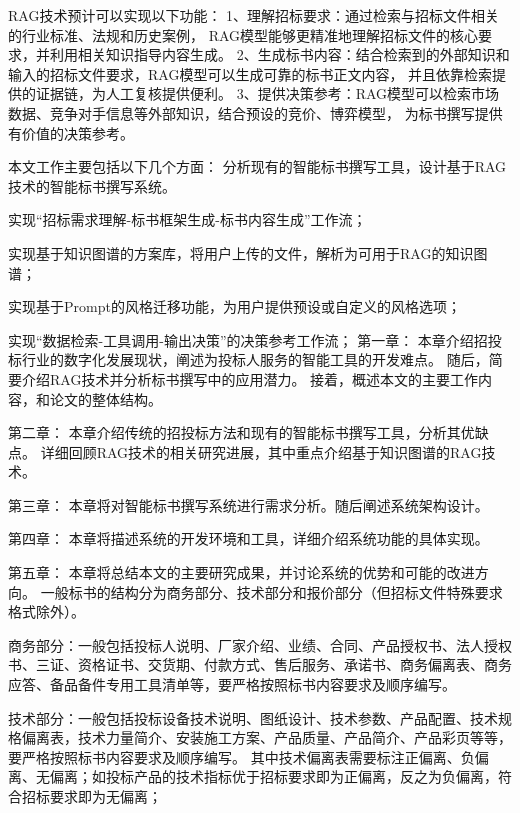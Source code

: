 \documentclass{xmu}
\begin{document}
RAG技术预计可以实现以下功能：
1、理解招标要求：通过检索与招标文件相关的行业标准、法规和历史案例，
RAG模型能够更精准地理解招标文件的核心要求，并利用相关知识指导内容生成。
2、生成标书内容：结合检索到的外部知识和输入的招标文件要求，RAG模型可以生成可靠的标书正文内容，
并且依靠检索提供的证据链，为人工复核提供便利。
3、提供决策参考：RAG模型可以检索市场数据、竞争对手信息等外部知识，结合预设的竞价、博弈模型，
为标书撰写提供有价值的决策参考。

本文工作主要包括以下几个方面：
分析现有的智能标书撰写工具，设计基于RAG技术的智能标书撰写系统。

实现“招标需求理解-标书框架生成-标书内容生成”工作流；

实现基于知识图谱的方案库，将用户上传的文件，解析为可用于RAG的知识图谱；

实现基于Prompt的风格迁移功能，为用户提供预设或自定义的风格选项；

实现“数据检索-工具调用-输出决策”的决策参考工作流；
第一章：
本章介绍招投标行业的数字化发展现状，阐述为投标人服务的智能工具的开发难点。
随后，简要介绍RAG技术并分析标书撰写中的应用潜力。
接着，概述本文的主要工作内容，和论文的整体结构。

第二章：
本章介绍传统的招投标方法和现有的智能标书撰写工具，分析其优缺点。
详细回顾RAG技术的相关研究进展，其中重点介绍基于知识图谱的RAG技术。

第三章：
本章将对智能标书撰写系统进行需求分析。随后阐述系统架构设计。

第四章：
本章将描述系统的开发环境和工具，详细介绍系统功能的具体实现。

第五章：
本章将总结本文的主要研究成果，并讨论系统的优势和可能的改进方向。
一般标书的结构分为商务部分、技术部分和报价部分（但招标文件特殊要求格式除外）。

商务部分：一般包括投标人说明、厂家介绍、业绩、合同、产品授权书、法人授权书、三证、资格证书、交货期、付款方式、售后服务、承诺书、商务偏离表、商务应答、备品备件专用工具清单等，要严格按照标书内容要求及顺序编写。

技术部分：一般包括投标设备技术说明、图纸设计、技术参数、产品配置、技术规格偏离表，技术力量简介、安装施工方案、产品质量、产品简介、产品彩页等等，要严格按照标书内容要求及顺序编写。
其中技术偏离表需要标注正偏离、负偏离、无偏离；如投标产品的技术指标优于招标要求即为正偏离，反之为负偏离，符合招标要求即为无偏离；
\end{document}
